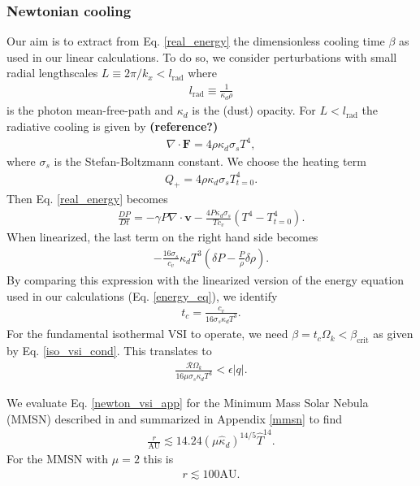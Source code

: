 \subsubsection{Newtonian cooling}
Our aim is to extract from Eq. \ref{real_energy} the dimensionless
cooling time $\beta$ as used in our linear calculations. To do so, we
consider perturbations with small radial lengthscales $L\equiv
2\pi/k_x<l_\mathrm{rad}$ where 
\begin{align}
l_\mathrm{rad} \equiv \frac{1}{\kappa_d\rho} 
\end{align} 
is the photon mean-free-path and $\kappa_d$ is the (dust) opacity. For
$L< l_\mathrm{rad}$ the radiative cooling is given by {\bf (reference?)}
\begin{align}
\nabla\cdot\bm{F} = 4 \rho \kappa_d \sigma_s T^4,
\end{align}   
where $\sigma_s$ is the Stefan-Boltzmann constant. We choose the
heating term 
\begin{align}
  Q_+ = 4\rho\kappa_d\sigma_s T^{4}_{t=0}. 
\end{align}
Then Eq. \ref{real_energy} becomes
\begin{align}
  \frac{DP}{Dt} = -\gamma P \nabla\cdot\bm{v} -
  \frac{4P\kappa_d\sigma_s}{Tc_v}\left(T^4 - T_{t=0}^4\right). 
\end{align}
When linearized, the last term on the right hand side becomes
\begin{align}
  -\frac{16\sigma_s}{c_v}\kappa_d T^3\left(\delta P -
    \frac{P}{\rho}\delta\rho\right). 
\end{align}
By comparing this expression with the linearized version of the energy
equation used in our calculations (Eq. \ref{energy_eq}), we identify 
\begin{align}
  t_c = \frac{c_v}{16\sigma_s\kappa_dT^3}.
\end{align}
For the fundamental isothermal VSI to operate, we need $\beta =
t_c\Omega_k< \beta_\mathrm{crit}$ as given by
Eq. \ref{iso_vsi_cond}. This translates to
\begin{align}\label{newton_vsi_app} 
  \frac{\mathcal{R}\Omega_k}{16\mu\sigma_s\kappa_dT^3} < \epsilon|q|. 
\end{align}


We evaluate Eq. \ref{newton_vsi_app} for the Minimum Mass Solar Nebula
(MMSN) described in \cite{chiang10} and summarized in Appendix
\ref{mmsn} to find
\begin{align}
  \frac{r}{\mathrm{AU}}\lesssim 14.24\left(\mu\hat{\kappa}_d
  \right)^{14/5}\hat{T}^{14}.
\end{align}
For the MMSN with $\mu=2$ this is
\begin{align*}
r\lesssim 100\mathrm{AU}. 
\end{align*}

